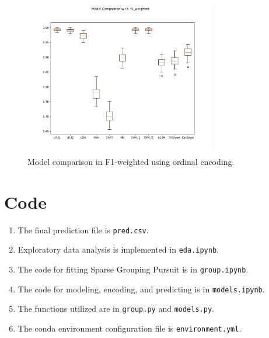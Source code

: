 \documentclass[11pt]{article}
\begin{document}
\begin{figure}[H]
    \centering
    \includegraphics[width=0.75\textwidth]{ordinal/model_compare_f1_weighted.pdf}
    \caption{Model comparison in F1-weighted using ordinal encoding.}
    \label{fig:ordinal_f1_weighted_compare}
\end{figure}


\section{Code}

\begin{enumerate}
    \item The final prediction file is \texttt{pred.csv}.
    \item Exploratory data analysis is implemented in \texttt{eda.ipynb}.
    \item The code for fitting Sparse Grouping Pursuit is in \texttt{group.ipynb}.
    \item The code for modeling, encoding, and predicting is in \texttt{models.ipynb}.
    \item The functions utilized are in \texttt{group.py} and \texttt{models.py}.
    \item The conda environment configuration file is \texttt{environment.yml}.
\end{enumerate}
\end{document}
